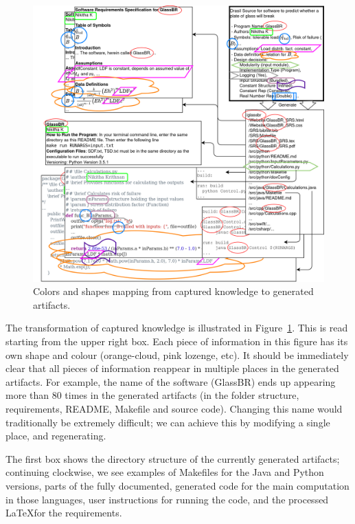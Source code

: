 \documentclass[sigconf,review,anonymous=false]{acmart}
\begin{document}
\begin{figure}[t]
  \centering
  \includegraphics[width=\linewidth]{assets/DrasilSupportsChange-right-portrait-overlapped-ungrouped-11ptFont-squished-noSmith-v1-300dpi.png}
  \caption{Colors and shapes mapping from captured knowledge to generated
  artifacts.}
  \label{Fig_DrasilAndChange}
\end{figure}

The transformation of captured knowledge is illustrated in
Figure~\ref{Fig_DrasilAndChange}. This is read starting from the upper
right box. Each piece of information in this figure has its own
shape and colour (orange-cloud, pink lozenge, etc). It should be immediately clear
that all pieces of information reappear in multiple places in the generated
artifacts. For example, the name of the software (GlassBR) ends up
appearing more than 80 times in the generated artifacts (in the folder
structure, requirements, README, Makefile and source code). Changing this
name would traditionally be extremely difficult; we can achieve this by
modifying a single place, and regenerating.

The first box shows the directory structure of the currently generated artifacts; continuing clockwise, we see examples of Makefiles for
the Java and Python versions, parts of the fully documented, 
generated code for the main computation in those languages, user
instructions for running the code, and the processed \LaTeX for the
requirements.
\end{document}
